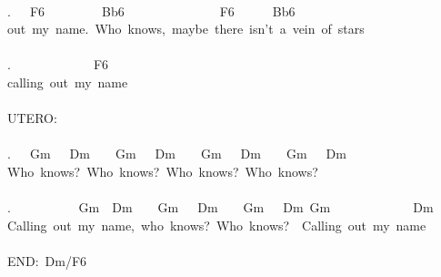 {\\
.\ \ \ F6\ \ \ \ \ \ \ \ \ Bb6\ \ \ \ \ \ \ \ \ \ \ \ \ \ \ F6\ \ \ \ \ \ Bb6\\
out\ my\ name.\ Who\ knows,\ maybe\ there\ isn't\ a\ vein\ of\ stars\\
\\
.\ \ \ \ \ \ \ \ \ \ \ \ \ F6\\
calling\ out\ my\ name\\
\\
UTERO:\\
\\
.\ \ \ Gm\ \ \ Dm\ \ \ \ Gm\ \ \ Dm\ \ \ \ Gm\ \ \ Dm\ \ \ \ Gm\ \ \ Dm\\
Who\ knows?\ Who\ knows?\ Who\ knows?\ Who\ knows?\\
\\
. \ \ \ \ \ \ \ \ \ \ Gm\ \ Dm\ \ \ \ Gm\ \ \ Dm\ \ \ \ Gm\ \ \ Dm\ Gm\ \ \ \ \ \ \ \ \ \ \ \ \ Dm\\
Calling\ out\ my\ name,\ who\ knows?\ Who\ knows?\ \ Calling\ out\ my\ name\\
\\
END:\ Dm/F6}
